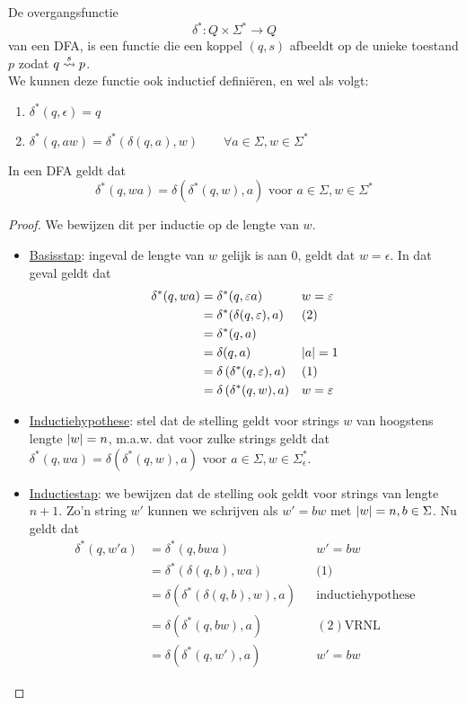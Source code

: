 \documentclass[../aanvullingen_cursus.tex]{subfiles}
\begin{document}
De overgangsfunctie \[ \delta^* : Q \times \Sigma^* \to Q\] van een DFA, is een functie die een koppel \((q,s)\) afbeeldt op de unieke toestand \(p\) zodat \(q \overset{s}{\rightsquigarrow} p\). \\We kunnen deze functie ook inductief definiëren, en wel als volgt:
\begin{enumerate}
	\item \( \delta^*(q,\epsilon)=q \)
	\item \( \delta^*(q,aw) = \delta^*(\delta(q,a),w) \qquad \forall a\in\Sigma, w\in\Sigma^*\)
\end{enumerate}


\begin{stelling}
	In een DFA geldt dat \[\delta^*(q,wa) = \delta\left(\delta^*(q,w),a\right) \text{ voor } a\in\Sigma, w\in\Sigma^*\]
\end{stelling}


\begin{proof}

	We bewijzen dit per inductie op de lengte van \(w\).

	\begin{itemize}
		\item \underline{Basisstap}: ingeval de lengte van \(w\) gelijk is aan 0, geldt dat \(w=\epsilon\). In dat geval geldt dat
		\begin{align*}
			\delta^*(q,wa) &= \delta^*(q,\varepsilon a) && w=\varepsilon \\
							&= \delta^*(\delta(q,\varepsilon),a) && \text{(2)} \\
							&= \delta^*(q,a) \\
							&= \delta(q,a) && \lvert a \rvert=1 \\
							&= \delta\left(\delta^*(q,\varepsilon),a\right) && \text{(1)} \\
							&= \delta\left(\delta^*(q,w),a\right) && w=\varepsilon
		\end{align*}
		\item \underline{Inductiehypothese}: stel dat de stelling geldt voor strings \(w\) van hoogstens lengte \(\lvert w \rvert=n\), m.a.w. dat voor zulke strings geldt dat \(\delta^*(q,wa) = \delta\left(\delta^*(q,w),a\right) \text{ voor } a\in\Sigma, w\in\Sigma_{\epsilon}^*\).
		\item \underline{Inductiestap}: we bewijzen dat de stelling ook geldt voor strings van lengte \(n+1\). Zo'n string \(w'\) kunnen we schrijven als \(w'=bw\) met \(\lvert w \rvert=n,b\in \Sigma\). Nu geldt dat
		\begin{align*}
			\delta^*(q,w'a) &= \delta^*(q, bwa) && w'=bw \\
			&= \delta^*(\delta(q,b), wa) && \text{(1)} \\
			&= \delta(\delta^*(\delta(q,b),w), a) && \text{inductiehypothese} \\
			&= \delta\left(\delta^*(q,bw),a\right) && (2) \text{VRNL} \\
			&= \delta\left(\delta^*(q,w'),a\right) && w'=bw
		\end{align*}
	\end{itemize}

\end{proof}
\end{document}
